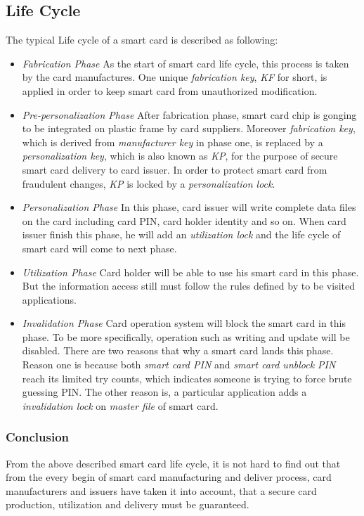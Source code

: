 \subsection{Life Cycle}
The typical Life cycle of a smart card is described as following\cite{smart_card_contactless}:
\begin{itemize}
\item \emph{Fabrication Phase} As the start of smart card life cycle, this process is taken by the card manufactures. One unique \emph{fabrication key}, \emph{KF} for short, is applied in order to keep smart card from unauthorized modification. 
\item \emph{Pre-personalization Phase} After fabrication phase,  smart card chip is gonging to be integrated on plastic frame by card suppliers. Moreover \emph{fabrication key}, which is derived from \emph{manufacturer key} in phase one, is replaced by a \emph{personalization key}, which is also known as \emph{KP},  for the purpose of secure smart card delivery to card issuer. In order to protect smart card from fraudulent changes, \emph{KP} is locked by a \emph{personalization lock}.
\item \emph{Personalization Phase} In this phase,  card issuer will write complete data files on the card including card PIN, card holder identity and so on. When card issuer finish this phase, he will add an \emph{utilization lock} and the life cycle of smart card will come to next phase.
\item \emph{Utilization Phase} Card holder will be able to use his smart card in this phase. But the information access still must follow the rules defined by to be visited applications.
\item \emph{Invalidation Phase} Card operation system will block the smart card in this phase. To be more specifically, operation such as writing and update will be disabled. There are two reasons that why a smart card lands this phase. Reason one is because both \emph{smart card PIN} and \emph{smart card unblock PIN} reach its limited  try counts, which indicates someone is trying to force brute guessing PIN.  The other reason is, a particular application adds a \emph{invalidation lock} on \emph{master file} of smart card.
\end{itemize}

\subsubsection {Conclusion}
From the above described smart card life cycle, it is not hard to find out that from the every begin of smart card manufacturing and deliver process, card manufacturers and issuers have taken it into account, that a secure card production, utilization and delivery must be guaranteed.

